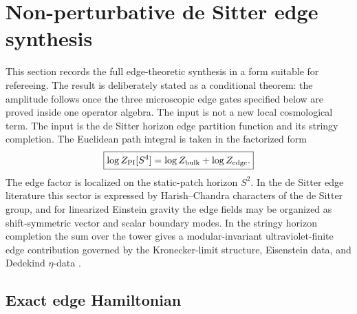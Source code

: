 \documentclass[aps,prd,reprint,nofootinbib,superscriptaddress,floatfix]{revtex4-2}
\numberwithin{equation}{section}
\theoremstyle{definition}
\theoremstyle{plain}
\begin{document}
\section{Non-perturbative de Sitter edge synthesis}
\label{sec:nonperturbative-edge-synthesis}

This section records the full edge-theoretic synthesis in a form suitable for
refereeing.  The result is deliberately stated as a conditional theorem:
the amplitude follows once the three microscopic edge gates specified below are
proved inside one operator algebra.  The input is not a new local cosmological
term.  The input is the de Sitter horizon edge partition function and its
stringy completion.  The Euclidean path integral is taken in the factorized
form
\[
\boxed{
\log Z_{\rm PI}[S^4]
=
\log Z_{\rm bulk}
+
\log Z_{\rm edge}.
}
\]
The edge factor is localized on the static-patch horizon \(S^2\).  In the
de Sitter edge literature this sector is expressed by Harish--Chandra
characters of the de Sitter group, and for linearized Einstein gravity the
edge fields may be organized as shift-symmetric vector and scalar boundary
modes.  In the stringy horizon completion the sum over the tower gives a
modular-invariant ultraviolet-finite edge contribution governed by the
Kronecker-limit structure, Eisenstein data, and Dedekind \(\eta\)-data
\cite{Law2025dSEdge,DabholkarHarrisMoitra2026,LawLochab2026}.

\subsection{Exact edge Hamiltonian}
\end{document}
